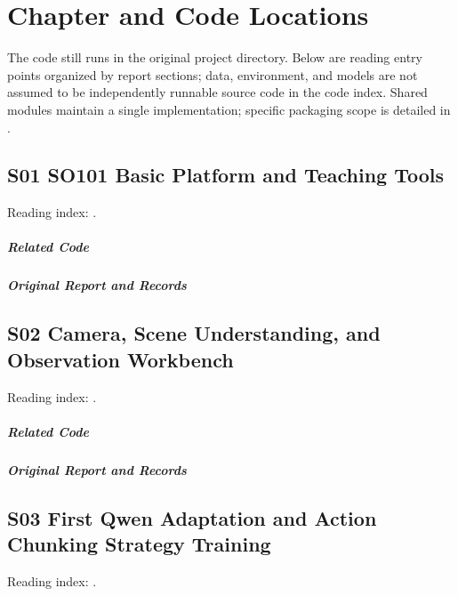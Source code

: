 \chapter{Chapter and Code Locations}
\label{app:code}
The code still runs in the original project directory. Below are reading entry points organized by report sections; data, environment, and models are not assumed to be independently runnable source code in the code index. Shared modules maintain a single implementation; specific packaging scope is detailed in .
\section*{S01 SO101 Basic Platform and Teaching Tools}
\hypertarget{code-s01}{}
Reading index: .
\paragraph{Related Code}
\noindent{}\par
\noindent{}\par
\noindent{}\par
\paragraph{Original Report and Records}
\noindent{}\par
\noindent{}\par
\section*{S02 Camera, Scene Understanding, and Observation Workbench}
\hypertarget{code-s02}{}
Reading index: .
\paragraph{Related Code}
\noindent{}\par
\noindent{}\par
\noindent{}\par
\paragraph{Original Report and Records}
\noindent{}\par
\section*{S03 First Qwen Adaptation and Action Chunking Strategy Training}
\hypertarget{code-s03}{}
Reading index: .
